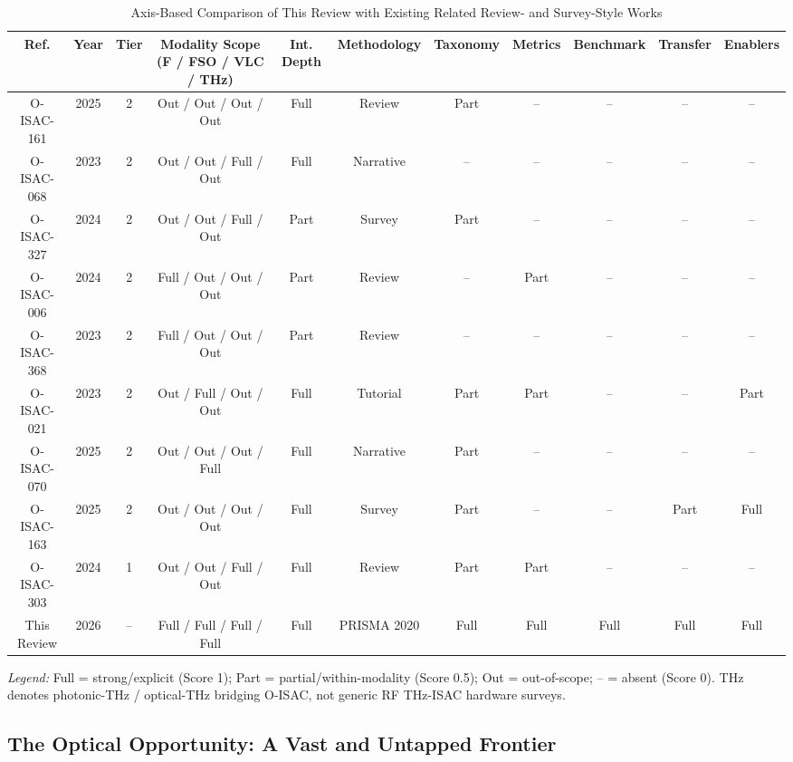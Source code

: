 \begin{table}[!t]
\caption{Axis-Based Comparison of This Review with Existing Related Review- and Survey-Style Works}
\label{tab:intro-related}
\centering
\scriptsize
\setlength{\tabcolsep}{3pt}
\begin{tabular}{ccccccccccc}
\toprule
Ref. & Year & Tier & Modality Scope (F / FSO / VLC / THz) & Int. Depth & Methodology & Taxonomy & Metrics & Benchmark & Transfer & Enablers \\
\midrule
O-ISAC-161 & 2025 & 2 & Out / Out / Out / Out & Full & Review & Part & -- & -- & -- & -- \\
O-ISAC-068 & 2023 & 2 & Out / Out / Full / Out & Full & Narrative & -- & -- & -- & -- & -- \\
O-ISAC-327 & 2024 & 2 & Out / Out / Full / Out & Part & Survey & Part & -- & -- & -- & -- \\
O-ISAC-006 & 2024 & 2 & Full / Out / Out / Out & Part & Review & -- & Part & -- & -- & -- \\
O-ISAC-368 & 2023 & 2 & Full / Out / Out / Out & Part & Review & -- & -- & -- & -- & -- \\
O-ISAC-021 & 2023 & 2 & Out / Full / Out / Out & Full & Tutorial & Part & Part & -- & -- & Part \\
O-ISAC-070 & 2025 & 2 & Out / Out / Out / Full & Full & Narrative & Part & -- & -- & -- & -- \\
O-ISAC-163 & 2025 & 2 & Out / Out / Out / Out & Full & Survey & Part & -- & -- & Part & Full \\
O-ISAC-303 & 2024 & 1 & Out / Out / Full / Out & Full & Review & Part & Part & -- & -- & -- \\
This Review & 2026 & -- & Full / Full / Full / Full & Full & PRISMA 2020 & Full & Full & Full & Full & Full \\
\bottomrule
\end{tabular}
\vspace{0.4em}

\parbox{0.96\textwidth}{\footnotesize \textit{Legend:} Full = strong/explicit (Score 1); Part = partial/within-modality (Score 0.5); Out = out-of-scope; -- = absent (Score 0). THz denotes photonic-THz / optical-THz bridging O-ISAC, not generic RF THz-ISAC hardware surveys.}
\end{table}

\subsection{The Optical Opportunity: A Vast and Untapped Frontier}

